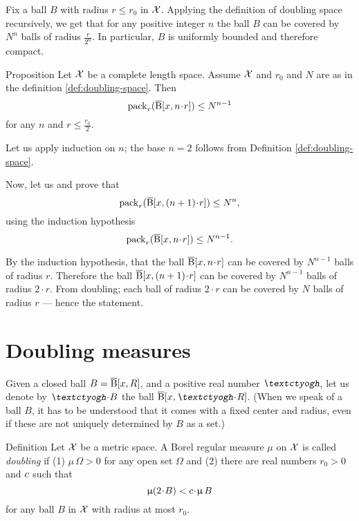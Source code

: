 Fix a ball $B$ with radius $r\le r_0$ in $\mathcal{X}$.
Applying the definition of doubling space recursively,
we get that for any positive integer $n$ 
the ball $B$ can be covered by $N^n$ balls of radius $\tfrac{r}{2^n}$.
In particular, $B$ is uniformly bounded 
and therefore compact.
\qeds

\begin{thm}{Proposition}\label{prop:2ble=>global}
Let $\mathcal{X}$ be a complete length space.
Assume $\mathcal{X}$ and $r_0$ and $N$ are as in the definition \ref{def:doubling-space}.
Then 
\[
\pack_{r}(\cBall[x,n\cdot r])\le N^{n-1}\]
for any $n$ and $r\le \frac{r_0}2$.
\end{thm}

Let us apply induction on $n$; the base $n=2$ follows from Definition \ref{def:doubling-space}.

Now, let us and prove that
\[\pack_{r}(\cBall[x,(n+1)\cdot r])\le N^n,\]
using the induction hypothesis 
\[\pack_{r}(\cBall[x,n\cdot r])\le N^{n-1}.\]

By the induction hypothesis, that the ball $\cBall[x,n\cdot r]$ can be covered by $N^{n-1}$ balls of radius $r$.
Therefore the ball $\cBall[x,(n+1)\cdot r]$ can be covered by $N^{n-1}$ balls of radius $2\cdot r$.
From doubling; each ball of radius $2\cdot r$ can be covered by $N$ balls of radius $r$ --- hence the statement.
\qeds

\section{Doubling measures}\label{sec:doubling-mes}

Given a closed ball $B=\overline{\mathrm{B}}{}[x,R]$,
and a positive real number $\lam$,
let us denote by $\lam \cdot B$ the ball $\cBall[x,\lam\cdot R]$.
(When we speak of a ball $B$, 
it has to be understood that it comes with a fixed center and radius, 
even if these are not uniquely determined by $B$ as a set.)



\begin{thm}{Definition}\label{def:doubling-measure}
Let $\mathcal{X}$ be a metric space. 
A Borel regular measure $\mu$ on $\mathcal{X}$ is called 
\emph{doubling} 
if 
(1) $\mu\,\Omega>0$ for any open set $\Omega$ 
and
(2) there are real numbers $r_0>0$ and $c$ such that
\[\mu (2\cdot B)
<
\Const\cdot \mu\, B\]
for any ball $B$ in $\mathcal{X}$ with radius at most $r_0$.
\end{thm}

